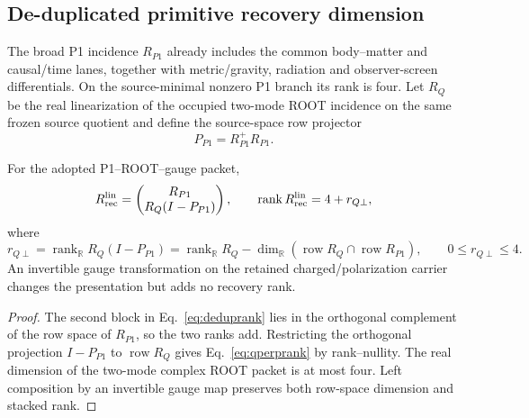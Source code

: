 \subsection{De-duplicated primitive recovery dimension}

The broad P1 incidence $R_{P1}$ already includes the common body--matter and
causal/time lanes, together with metric/gravity, radiation and observer-screen
differentials.
On the source-minimal nonzero P1 branch its rank is four.  Let $R_Q$ be the
real linearization of the occupied two-mode ROOT incidence on the same frozen
source quotient and define the source-space row projector
\begin{equation}
P_{P1}=R_{P1}^{+}R_{P1}.
\label{eq:p1rowprojector}
\end{equation}

\begin{proposition}
\label{prop:deduprank}
For the adopted P1--ROOT--gauge packet,
\begin{equation}
R_{\rm rec}^{\rm lin}
=\begin{pmatrix}R_{P1}\\ R_Q(I-P_{P1})\end{pmatrix},
\qquad
\operatorname{rank}R_{\rm rec}^{\rm lin}=4+r_{Q\perp},
\label{eq:deduprank}
\end{equation}
where
\begin{equation}
r_{Q\perp}
=\operatorname{rank}_{\mathbb R}R_Q(I-P_{P1})
=\operatorname{rank}_{\mathbb R}R_Q
-\dim_{\mathbb R}(\operatorname{row}R_Q
\cap\operatorname{row}R_{P1}),
\qquad 0\le r_{Q\perp}\le4.
\label{eq:qperprank}
\end{equation}
An invertible gauge transformation on the retained charged/polarization
carrier changes the presentation but adds no recovery rank.
\end{proposition}

\begin{proof}
The second block in Eq.~\eqref{eq:deduprank} lies in the orthogonal complement
of the row space of $R_{P1}$, so the two ranks add.  Restricting the orthogonal
projection $I-P_{P1}$ to $\operatorname{row}R_Q$ gives
Eq.~\eqref{eq:qperprank} by rank--nullity.  The real dimension of the two-mode
complex ROOT packet is at most four.  Left composition by an invertible gauge
map preserves both row-space dimension and stacked rank.
\end{proof}

